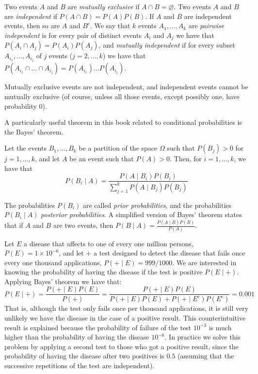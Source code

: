 Two events $A$ and $B$ are \emph{mutually exclusive} if $A \cap B = \varnothing$. Two events $A$ and $B$ are \emph{independent} if $P(A \cap B) = P(A)P(B)$. If $A$ and $B$ are independent events, then so are $A$ and $B^c$. We say that $k$ events $A_1, \ldots, A_k$ are \emph{pairwise independent} is for every pair of distinct events $A_i$ and $A_j$ we have that $P(A_i \cap A_j) = P(A_i) P(A_j)$, and \emph{mutually independent} if for every subset $A_{i_1}, \ldots, A_{i_j}$ of $j$ events ($j = 2, \ldots, k$) we have that $P(A_{i_1} \cap \ldots \cap A_{i_j}) = P(A_{i_1}) \ldots P(A_{i_j})$.

\begin{example}
Mutually exclusive events are not independent, and independent events cannot be mutually exclusive (of course, unless all those events, except possibly one, have probability 0).
\end{example}

A particularly useful theorem in this book related to conditional probabilities is the Bayes' theorem.

\begin{theorem}
\label{th:bayes}
Let the events $B_1, \ldots, B_k$ be a partition of the space $\Omega$ such that $P(B_j) > 0$ for $j = 1, \ldots, k$, and let $A$ be an event such that $P(A) > 0$. Then, for $i = 1, \ldots, k$, we have that
\[
P(B_i \mid A) = \frac{P(A \mid B_i) P(B_i)}{\sum_{j=1}^{k} P(A \mid B_j) P(B_j)}
\]
\end{theorem}

The probabilities $P(B_i)$ are called \emph{prior probabilities}, and the probabilities $P(B_i \mid A)$ \emph{posterior probabilities}. A simplified version of Bayes' theorem states that if $A$ and $B$ are two events, then $P(B \mid A) = \frac{P(A \mid B) P(B)}{P(A)}$.

\begin{example}
Let $E$ a disease that affects to one of every one million persons, $P(E) = 1 \times 10^{-6}$, and let $+$ a test designed to detect the disease that fails once every one thousand applications, $P(+ \mid E) = 999/1000$. We are interested in knowing the probability of having the disease if the test is positive $P(E \mid +)$. Applying Bayes' theorem we have that:
\[
P(E \mid +) = \frac{P(+ \mid E) P(E)}{P(+)} = \frac{P(+ \mid E) P(E)}{P(+ \mid E) P(E) + P(+ \mid E^c) P(E^c)} = 0.001
\]
That is, although the test only fails once per thousand applications, it is still very unlikely we have the disease in the case of a positive result. This counterintuitive result is explained because the probability of failure of the test $10^{-3}$ is much higher than the probability of having the disease $10^{-6}$. In practice we solve this problem by applying a second test to those who got a positive result, since the probability of having the disease after two positives is $0.5$ (assuming that the successive repetitions of the test are independent).
\end{example}

